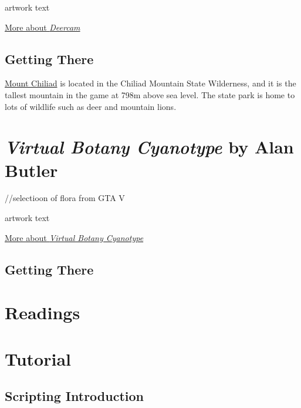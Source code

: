 \documentclass[
  openany]{book}
\begin{document}
artwork text

\href{https://bwatanabe.com/GTA_V_WanderingDeer.html}{More about \emph{Deercam}}

\hypertarget{getting-there-5}{%
\subsection*{Getting There}\label{getting-there-5}}

\href{https://grandtheftdata.com/landmarks/\#86.534,6158.577,4,atlas,name=mount_chiliad,Mount_Chiliad}{Mount Chiliad} is located in the Chiliad Mountain State Wilderness, and it is the tallest mountain in the game at 798m above sea level. The state park is home to lots of wildlife such as deer and mountain lions.

\hypertarget{virtual-botany-cyanotype-by-alan-butler}{%
\section*{\texorpdfstring{\emph{Virtual Botany Cyanotype} by Alan Butler}{Virtual Botany Cyanotype by Alan Butler}}\label{virtual-botany-cyanotype-by-alan-butler}}

//selectioon of flora from GTA V

artwork text

\href{http://www.alanbutler.info/virtual-botany-cyanotypes}{More about \emph{Virtual Botany Cyanotype}}

\hypertarget{getting-there-6}{%
\subsection*{Getting There}\label{getting-there-6}}

\hypertarget{readings-3}{%
\section*{Readings}\label{readings-3}}

\hypertarget{tutorial-3}{%
\section*{Tutorial}\label{tutorial-3}}

\hypertarget{scripting-introduction}{%
\subsection*{Scripting Introduction}\label{scripting-introduction}}
\end{document}
